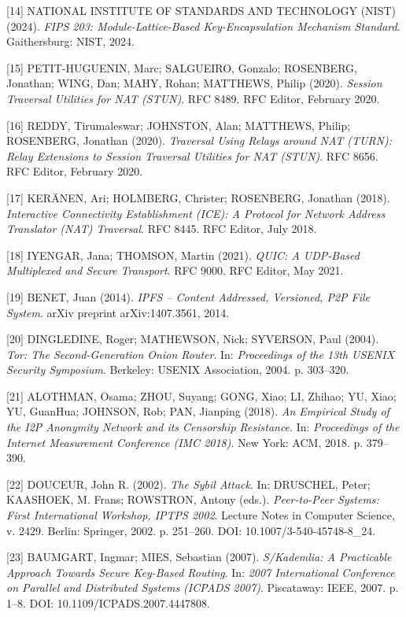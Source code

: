 \documentclass[12pt]{article}
\begin{document}
[14] NATIONAL INSTITUTE OF STANDARDS AND TECHNOLOGY (NIST) (2024). \textit{FIPS 203: Module-Lattice-Based Key-Encapsulation Mechanism Standard}. Gaithersburg: NIST, 2024.

[15] PETIT-HUGUENIN, Marc; SALGUEIRO, Gonzalo; ROSENBERG, Jonathan; WING, Dan; MAHY, Rohan; MATTHEWS, Philip (2020).
\textit{Session Traversal Utilities for NAT (STUN)}.
RFC 8489. RFC Editor, February 2020.

[16] REDDY, Tirumaleswar; JOHNSTON, Alan; MATTHEWS, Philip; ROSENBERG, Jonathan (2020).
\textit{Traversal Using Relays around NAT (TURN): Relay Extensions to Session Traversal Utilities for NAT (STUN)}.
RFC 8656. RFC Editor, February 2020.

[17] KER\"ANEN, Ari; HOLMBERG, Christer; ROSENBERG, Jonathan (2018).
\textit{Interactive Connectivity Establishment (ICE): A Protocol for Network Address Translator (NAT) Traversal}.
RFC 8445. RFC Editor, July 2018.

[18] IYENGAR, Jana; THOMSON, Martin (2021).
\textit{QUIC: A UDP-Based Multiplexed and Secure Transport}.
RFC 9000. RFC Editor, May 2021.

[19] BENET, Juan (2014).
\textit{IPFS -- Content Addressed, Versioned, P2P File System}.
arXiv preprint arXiv:1407.3561, 2014.

[20] DINGLEDINE, Roger; MATHEWSON, Nick; SYVERSON, Paul (2004).
\textit{Tor: The Second-Generation Onion Router}.
In: \textit{Proceedings of the 13th USENIX Security Symposium}.
Berkeley: USENIX Association, 2004. p. 303--320.

[21] ALOTHMAN, Osama; ZHOU, Suyang; GONG, Xiao; LI, Zhihao; YU, Xiao; YU, GuanHua; JOHNSON, Rob; PAN, Jianping (2018).
\textit{An Empirical Study of the I2P Anonymity Network and its Censorship Resistance}.
In: \textit{Proceedings of the Internet Measurement Conference (IMC 2018)}.
New York: ACM, 2018. p. 379--390.

[22] DOUCEUR, John R. (2002).
\textit{The Sybil Attack}.
In: DRUSCHEL, Peter; KAASHOEK, M. Frans; ROWSTRON, Antony (eds.).
\textit{Peer-to-Peer Systems: First International Workshop, IPTPS 2002}.
Lecture Notes in Computer Science, v. 2429.
Berlin: Springer, 2002. p. 251--260.
DOI: 10.1007/3-540-45748-8\_24.

[23] BAUMGART, Ingmar; MIES, Sebastian (2007).
\textit{S/Kademlia: A Practicable Approach Towards Secure Key-Based Routing}.
In: \textit{2007 International Conference on Parallel and Distributed Systems (ICPADS 2007)}.
Piscataway: IEEE, 2007. p. 1--8.
DOI: 10.1109/ICPADS.2007.4447808.
\end{document}
